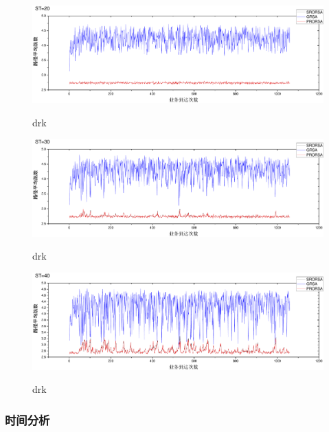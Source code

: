 \begin{figure}
\setlength{\belowcaptionskip}{-0.5cm}
  \begin{center}
    {\includegraphics[width=1 \textwidth]{figures/B20H.pdf}}
    \end{center}
  \caption{{\footnotesize{drk}}}
  \label{drk}
\end{figure}
\begin{figure}
\setlength{\belowcaptionskip}{-0.5cm}
  \begin{center}
    {\includegraphics[width=1 \textwidth]{figures/B30H.pdf}}
    \end{center}
  \caption{{\footnotesize{drk}}}
  \label{drk}
\end{figure}
\begin{figure}
\setlength{\belowcaptionskip}{-0.5cm}
  \begin{center}
    {\includegraphics[width=1 \textwidth]{figures/B40H.pdf}}
    \end{center}
  \caption{{\footnotesize{drk}}}
  \label{drk}
\end{figure}
\subsubsection{时间分析}

